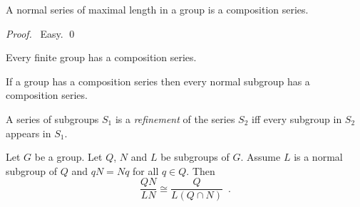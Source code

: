 \begin{prop}
A normal series of maximal length in a group is a composition series.
\end{prop}

\begin{proof}
\pf\ Easy. \qed
\end{proof}

\begin{cor}
Every finite group has a composition series.
\end{cor}

\begin{cor}
If a group has a composition series then every normal subgroup has a composition series.
\end{cor}

\begin{df}[Refinement]
A series of subgroups $S_1$ is a \emph{refinement} of the series $S_2$ iff every subgroup in $S_2$ appears in $S_1$.
\end{df}

\begin{lm}
\label{lm:Schreier}
Let $G$ be a group. Let $Q$, $N$ and $L$ be subgroups of $G$. Assume $L$ is a normal subgroup of $Q$ and $qN = Nq$ for all $q \in Q$. Then
\[ \frac{QN}{LN} \cong \frac{Q}{L(Q \cap N)} \enspace . \]
\end{lm}

